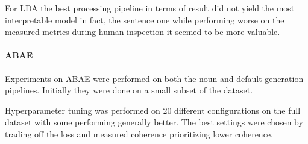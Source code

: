 For LDA the best processing pipeline in terms of result did not yield the most interpretable model in fact,
the sentence one while performing worse on the measured metrics during human inspection it seemed to be more valuable.

\paragraph{ABAE}
Experiments on ABAE were performed on both the noun and default generation pipelines.
Initially they were done on a small subset of the dataset.

Hyperparameter tuning was performed on 20 different configurations on the full dataset with some performing generally better.
The best settings were chosen by trading off the loss and measured coherence prioritizing lower coherence.
